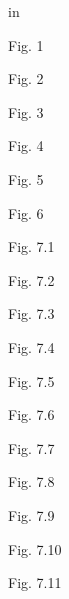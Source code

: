 \newcommand{\bflr}{\begin{flushright}}
\newcommand{\eflr}{\end{flushright}}
\newcommand{\bcen}{\begin{centering}}
\newcommand{\ecen}{\end{centering}}
\pagestyle{empty}
\headheight 0pt  \headsep 0pt
\topmargin 0pt  \oddsidemargin 0pt   in \textwidth 6.3in



\newpage
\vspace*{\fill}
\centerline{Fig. 1}

\newpage
\vspace*{\fill}
\centerline{Fig. 2}

\newpage
\vspace*{\fill}
\centerline{Fig. 3}

\newpage
\vspace*{\fill}
\centerline{Fig. 4}

\newpage
\vspace*{\fill}
\centerline{Fig. 5}

\newpage
\vspace*{\fill}
\centerline{Fig. 6}

\newpage
\vspace*{\fill}
\centerline{Fig. 7.1}

\newpage
\vspace*{\fill}
\centerline{Fig. 7.2}

\newpage
\vspace*{\fill}
\centerline{Fig. 7.3}

\newpage
\vspace*{\fill}
\centerline{Fig. 7.4}

\newpage
\vspace*{\fill}
\centerline{Fig. 7.5}

\newpage
\vspace*{\fill}
\centerline{Fig. 7.6}

\newpage
\vspace*{\fill}
\centerline{Fig. 7.7}

\newpage
\vspace*{\fill}
\centerline{Fig. 7.8}

\newpage
\vspace*{\fill}
\centerline{Fig. 7.9}

\newpage
\vspace*{\fill}
\centerline{Fig. 7.10}

\newpage
\vspace*{\fill}
\centerline{Fig. 7.11}

